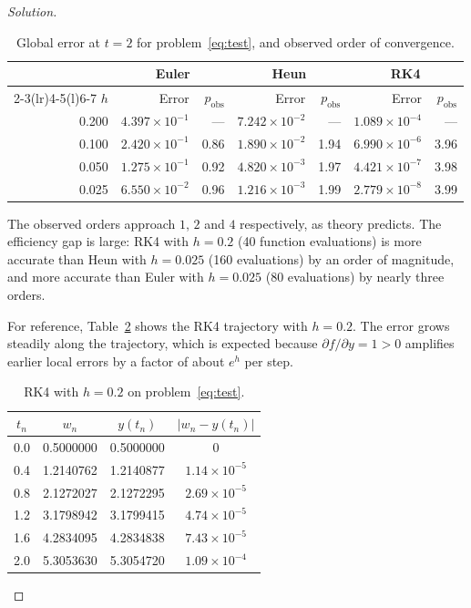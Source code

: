 \documentclass[11pt]{article}
\theoremstyle{definition}
\newenvironment{solution}{\begin{proof}[Solution]}{\end{proof}}
\begin{document}
\begin{solution}
\begin{table}[ht]
  \centering
  \caption{Global error at $t = 2$ for problem~\eqref{eq:test}, and observed order of convergence.}
  \label{tab:errors}
  \begin{tabular}{@{}r rr rr rr@{}}
    \toprule
    & \multicolumn{2}{c}{Euler} & \multicolumn{2}{c}{Heun} & \multicolumn{2}{c}{RK4} \\
    \cmidrule(lr){2-3}\cmidrule(lr){4-5}\cmidrule(l){6-7}
    $h$ & Error & $p_{\text{obs}}$ & Error & $p_{\text{obs}}$ & Error & $p_{\text{obs}}$ \\
    \midrule
    0.200 & $4.397\times10^{-1}$ & ---  & $7.242\times10^{-2}$ & ---  & $1.089\times10^{-4}$ & ---  \\
    0.100 & $2.420\times10^{-1}$ & 0.86 & $1.890\times10^{-2}$ & 1.94 & $6.990\times10^{-6}$ & 3.96 \\
    0.050 & $1.275\times10^{-1}$ & 0.92 & $4.820\times10^{-3}$ & 1.97 & $4.421\times10^{-7}$ & 3.98 \\
    0.025 & $6.550\times10^{-2}$ & 0.96 & $1.216\times10^{-3}$ & 1.99 & $2.779\times10^{-8}$ & 3.99 \\
    \bottomrule
  \end{tabular}
\end{table}

The observed orders approach $1$, $2$ and $4$ respectively, as theory predicts. The efficiency gap is large: RK4 with $h = 0.2$ (40 function evaluations) is more accurate than Heun with $h = 0.025$ (160 evaluations) by an order of magnitude, and more accurate than Euler with $h = 0.025$ (80 evaluations) by nearly three orders.

For reference, Table~\ref{tab:traj} shows the RK4 trajectory with $h = 0.2$. The error grows steadily along the trajectory, which is expected because $\partial f/\partial y = 1 > 0$ amplifies earlier local errors by a factor of about $e^{h}$ per step.

\begin{table}[ht]
  \centering
  \caption{RK4 with $h = 0.2$ on problem~\eqref{eq:test}.}
  \label{tab:traj}
  \begin{tabular}{@{}cccc@{}}
    \toprule
    $t_n$ & $w_n$ & $y(t_n)$ & $|w_n - y(t_n)|$ \\
    \midrule
    0.0 & 0.5000000 & 0.5000000 & 0 \\
    0.4 & 1.2140762 & 1.2140877 & $1.14\times10^{-5}$ \\
    0.8 & 2.1272027 & 2.1272295 & $2.69\times10^{-5}$ \\
    1.2 & 3.1798942 & 3.1799415 & $4.74\times10^{-5}$ \\
    1.6 & 4.2834095 & 4.2834838 & $7.43\times10^{-5}$ \\
    2.0 & 5.3053630 & 5.3054720 & $1.09\times10^{-4}$ \\
    \bottomrule
  \end{tabular}
\end{table}
\end{solution}
\end{document}
